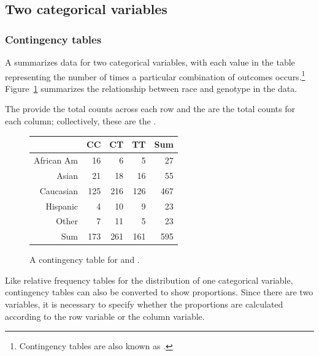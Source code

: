 \textD{\ \\[5mm]}


\subsection{Two categorical variables}

\subsubsection{Contingency tables}

A  summarizes data for two categorical variables, with each value in the table representing the number of times a particular combination of outcomes occurs.\footnote{Contingency tables are also known as .} Figure~\ref{famussContingencyTable} summarizes the relationship between race and genotype in the  data.

The  provide the total counts across each row and the  are the total counts for each column; collectively, these are the .

\begin{figure}[ht]
	\centering
	\begin{tabular}{rrrrr}
		\hline
		& CC & CT & TT & Sum \\ 
		\hline
		African Am & 16 & 6 & 5 & 27 \\ 
		Asian & 21 & 18 & 16 & 55 \\ 
		Caucasian & 125 & 216 & 126 & 467 \\ 
		Hispanic & 4 & 10 & 9 & 23 \\ 
		Other & 7 & 11 & 5 & 23 \\ 
		Sum & 173 & 261 & 161 & 595 \\ 
		\hline
	\end{tabular}
	\caption{A contingency table for  and .} 
	\label{famussContingencyTable}
\end{figure}

\textD{\newpage}

Like relative frequency tables for the distribution of one categorical variable, contingency tables can also be converted to show proportions. Since there are two variables, it is necessary to specify whether the proportions are calculated according to the row variable or the column variable. 

